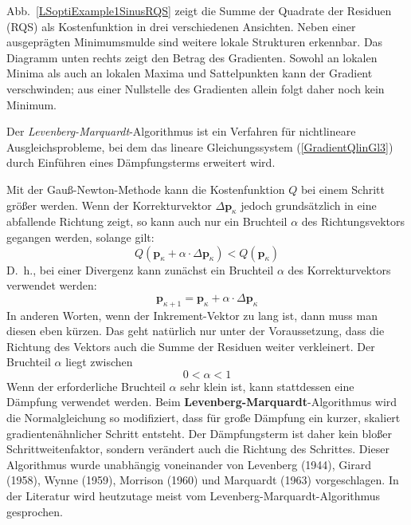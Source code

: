 Abb.~\ref{LSoptiExample1SinusRQS} zeigt die Summe der Quadrate der Residuen (RQS) als Kostenfunktion in drei
verschiedenen Ansichten. Neben einer ausgeprägten Minimumsmulde sind weitere lokale
Strukturen erkennbar. Das Diagramm unten rechts zeigt den Betrag des Gradienten.
Sowohl an lokalen Minima als auch an lokalen Maxima und Sattelpunkten kann der
Gradient verschwinden; aus einer Nullstelle des Gradienten allein folgt daher noch
kein Minimum.

Der \textsl{Levenberg-Marquardt}-Algorithmus ist ein Verfahren für nichtlineare
Ausgleichsprobleme, bei dem das lineare Gleichungssystem
(\ref{GradientQlinGl3})
durch Einführen eines Dämpfungsterms erweitert wird.

Mit der Gauß-Newton-Methode kann die Kostenfunktion $Q$ bei einem Schritt größer
werden. Wenn der Korrekturvektor $\Delta \mathbf{p}_{\kappa}$ jedoch grundsätzlich
in eine abfallende Richtung zeigt, so kann auch nur ein Bruchteil $\alpha$ des Richtungsvektors gegangen
werden, solange gilt:
\begin{equation}
Q(\mathbf{p}_{\kappa} + \alpha \cdot \Delta \mathbf{p}_{\kappa}) < Q(\mathbf{p}_{\kappa})
\end{equation}
D.~h., bei einer Divergenz kann zunächst ein Bruchteil $\alpha$ des
Korrekturvektors verwendet werden:
\begin{equation}
\mathbf{p}_{\kappa+1}= \mathbf{p}_{\kappa} + \alpha \cdot \Delta\mathbf{p}_{\kappa}
\end{equation}
In anderen Worten, wenn der Inkrement-Vektor zu lang ist, dann muss man diesen
eben kürzen. Das geht natürlich nur unter der Voraussetzung, dass die Richtung
des Vektors auch die Summe der Residuen weiter verkleinert. Der Bruchteil $\alpha$
liegt zwischen
$$
0 < \alpha < 1
$$
Wenn der erforderliche Bruchteil $\alpha$ sehr klein ist, kann stattdessen eine
Dämpfung verwendet werden. Beim \textbf{Levenberg-Marquardt}-Algorithmus wird die
Normalgleichung so modifiziert, dass für große Dämpfung ein kurzer, skaliert
gradientenähnlicher Schritt entsteht. Der Dämpfungsterm ist daher kein bloßer
Schrittweitenfaktor, sondern verändert auch die Richtung des Schrittes. Dieser
Algorithmus wurde unabhängig voneinander von Levenberg (1944), Girard (1958), Wynne (1959),
Morrison (1960) und Marquardt (1963) vorgeschlagen. In der Literatur wird heutzutage meist vom
Levenberg-Marquardt-Algorithmus gesprochen.

